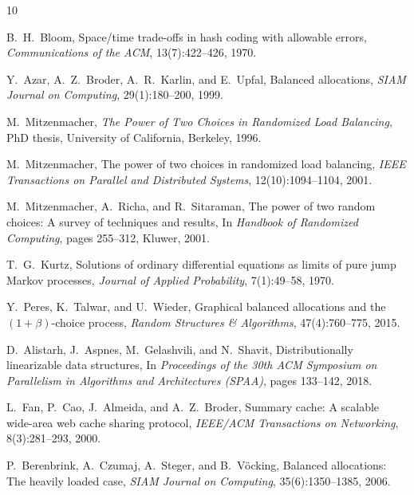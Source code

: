 \documentclass[11pt,a4paper]{article}
\begin{document}
\begin{thebibliography}{10}

B.~H.~Bloom,
\newblock Space/time trade-offs in hash coding with allowable errors,
\newblock \emph{Communications of the ACM}, 13(7):422--426, 1970.

Y.~Azar, A.~Z.~Broder, A.~R.~Karlin, and E.~Upfal,
\newblock Balanced allocations,
\newblock \emph{SIAM Journal on Computing}, 29(1):180--200, 1999.

M.~Mitzenmacher,
\newblock \emph{The Power of Two Choices in Randomized Load Balancing},
\newblock PhD thesis, University of California, Berkeley, 1996.

M.~Mitzenmacher,
\newblock The power of two choices in randomized load balancing,
\newblock \emph{IEEE Transactions on Parallel and Distributed Systems},
  12(10):1094--1104, 2001.

M.~Mitzenmacher, A.~Richa, and R.~Sitaraman,
\newblock The power of two random choices: A survey of techniques and results,
\newblock In \emph{Handbook of Randomized Computing}, pages 255--312,
  Kluwer, 2001.

T.~G.~Kurtz,
\newblock Solutions of ordinary differential equations as limits of pure jump
  Markov processes,
\newblock \emph{Journal of Applied Probability}, 7(1):49--58, 1970.

Y.~Peres, K.~Talwar, and U.~Wieder,
\newblock Graphical balanced allocations and the $(1+\beta)$-choice process,
\newblock \emph{Random Structures \& Algorithms}, 47(4):760--775, 2015.

D.~Alistarh, J.~Aspnes, M.~Gelashvili, and N.~Shavit,
\newblock Distributionally linearizable data structures,
\newblock In \emph{Proceedings of the 30th ACM Symposium on Parallelism in
  Algorithms and Architectures (SPAA)}, pages 133--142, 2018.

L.~Fan, P.~Cao, J.~Almeida, and A.~Z.~Broder,
\newblock Summary cache: A scalable wide-area web cache sharing protocol,
\newblock \emph{IEEE/ACM Transactions on Networking}, 8(3):281--293, 2000.

P.~Berenbrink, A.~Czumaj, A.~Steger, and B.~V{\"o}cking,
\newblock Balanced allocations: The heavily loaded case,
\newblock \emph{SIAM Journal on Computing}, 35(6):1350--1385, 2006.

\end{thebibliography}
\end{document}

